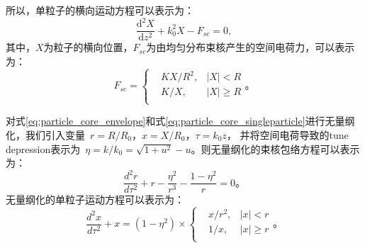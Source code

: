 所以，单粒子的横向运动方程可以表示为：
\begin{equation}
    \label{eq:particle_core_singleparticle}
    \frac{{{\text{d}}^{2}}X}{\text{d}{{z}^{2}}}+k_{0}^{2}X-{{F}_{sc}}=0,
\end{equation}
其中，$X$为粒子的横向位置，${F}_{sc}$为由均匀分布束核产生的空间电荷力，可以表示为：
\begin{equation}
{{F}_{sc}}=\left\{
        \begin{aligned}
        & KX/{{R}^{2}}, &\left| X \right|<R \\
        & K/X,          &\left| X \right|\ge R \\
        \end{aligned} \right. \text{。}
\end{equation}

对式\eqref{eq:particle_core_envelope}和式\eqref{eq:particle_core_singleparticle}进行无量纲化，我们引入变量~$r=R/R_0$，$x=X/R_0$，$\tau = k_0 z $，
并将空间电荷导致的tune depression表示为~$\eta = k/k_0 = \sqrt{1+u^2}-u$。则无量纲化的束核包络方程可以表示为：
\begin{equation}
    \label{eq:particle_core_envelope_dimensionless}
    \frac{{{d}^{2}}r}{d{{\tau}^{2}}}+r-\frac{{{\eta }^{2}}}{{{r}^{3}}}-\frac{1-{\eta}^2}{r}=0 \text{。}
\end{equation}
无量纲化的单粒子运动方程可以表示为：
\begin{equation}
    \label{eq:particle_core_singleparticle_dimensionless}
    \frac{{{d}^{2}}x}{d{{\tau}^{2}}}+x = (1-{\eta}^2) \times \left\{
        \begin{aligned}
        & x/{{r}^{2}}, &\left| x \right|<r \\
        & 1/x,         &\left| x \right|\ge r \\
        \end{aligned} \right. \text{。}
\end{equation}


